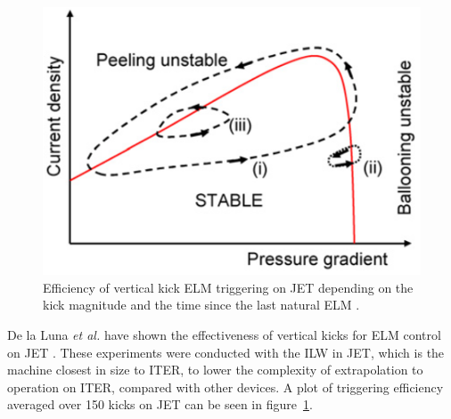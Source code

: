 \documentclass[11pt, twocolumn]{article}  %
\begin{document}
\begin{figure}
\includegraphics[scale=0.35]{Figures/ELMcycles.png}
\centering
\caption{Efficiency of vertical kick ELM triggering on JET depending on the kick magnitude and the time since the last natural ELM \cite{Chapman2016}.}\label{fig:VKELMprob}
\end{figure}

De la Luna \textit{et al.} have shown the effectiveness of vertical kicks for ELM control on JET \cite{DelaLuna2016}. These experiments were conducted with the ILW in JET, which is the machine closest in size to ITER, to lower the complexity of extrapolation to operation on ITER, compared with other devices. A plot of triggering efficiency averaged over 150 kicks on JET can be seen in figure~\ref{fig:VKELMprob}.
\end{document}
